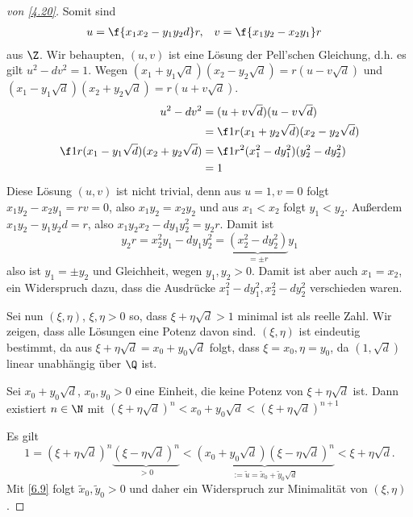 \begin{proof}[von \ref{4.20}]
	Somit sind
	\begin{align*}
		u &= \f {x_1 x_2 - y_1 y_2 d}r, &
		v &= \f {x_1 y_2 - x_2 y_1}r
	\end{align*}
	aus $\Z$.
	Wir behaupten, $(u, v)$ ist eine Lösung der Pell'schen Gleichung, d.h. es gilt $u^2 - dv^2 = 1$.
	Wegen $(x_1 + y_1 \sqrt d)(x_2 - y_2 \sqrt d) = r(u - v \sqrt d)$ und $(x_1 - y_1 \sqrt d)(x_2 + y_2 \sqrt d) = r(u + v \sqrt d)$.
	\begin{align*}
		u^2 - dv^2
		&= (u + v \sqrt d)(u - v \sqrt d) \\
		&= \f 1r (x_1 + y_2 \sqrt d)(x_2 - y_2 \sqrt d) \\
			\f 1r (x_1 - y_1 \sqrt d)(x_2 + y_2 \sqrt d)
		&= \f 1{r^2}(x_1^2 - dy_1^2)(y_2^2 - dy_2^2) \\
		&= 1
	\end{align*}
	Diese Lösung $(u,v)$ ist nicht trivial, denn aus $u = 1, v = 0$ folgt $x_1 y_2 - x_2 y_1 = rv = 0$, also $x_1 y_2 = x_2 y_2$ und aus $x_1 < x_2$ folgt $y_1 < y_2$.
	Außerdem $x_1 y_2 - y_1 y_2 d = r$, also $x_1 y_2 x_2 - d y_1 y_2^2 = y_2 r$.
	Damit ist
	\[
		y_2 r = x_2^2 y_1 - dy_1 y_2^2 = \underbrace{(x_2^2 - dy_2^2)}_{=\pm r}y_1
	\]
	also ist $y_1 = \pm y_2$ und Gleichheit, wegen $y_1, y_2 > 0$.
	Damit ist aber auch $x_1 = x_2$, ein Widerspruch dazu, dass die Ausdrücke $x_1^2 - dy_1^2, x_2^2 - dy_2^2$ verschieden waren.

	Sei nun $(\xi, \eta)$, $\xi, \eta > 0$ so, dass $\xi + \eta \sqrt d > 1$ minimal ist als reelle Zahl.
	Wir zeigen, dass alle Lösungen eine Potenz davon sind.
	$(\xi, \eta)$ ist eindeutig bestimmt, da aus $\xi + \eta \sqrt d = x_0 + y_0 \sqrt d$ folgt, dass $\xi = x_0, \eta = y_0$, da $(1, \sqrt d)$ linear unabhängig über $\Q$ ist.

	Sei $x_0 + y_0 \sqrt d$, $x_0, y_0 > 0$ eine Einheit, die keine Potenz von $\xi + \eta \sqrt d$ ist.
	Dann existiert $n \in \N$ mit $(\xi + \eta \sqrt d)^n < x_0 + y_0 \sqrt d < (\xi + \eta \sqrt d)^{n+1}$

	Es gilt
	\[
		1 = (\xi + \eta \sqrt d)^n \underbrace{(\xi - \eta \sqrt d)^n}_{> 0}
		< \underbrace{(x_0 + y_0\sqrt d)(\xi - \eta \sqrt d)^n}_{:= \tilde u = \tilde x_0 + \tilde y_0 \sqrt d}
		< \xi + \eta \sqrt d.
	\]
	Mit \ref{6.9} folgt $\tilde x_0, \tilde y_0 > 0$ und daher ein Widerspruch zur Minimalität von $(\xi, \eta)$.
\end{proof}

